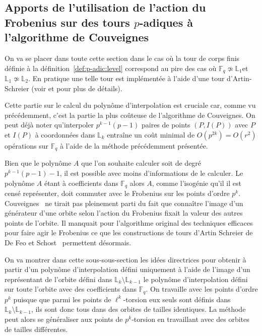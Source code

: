 \documentclass[10pt,a4paper]{book}
\theoremstyle{plain}
\theoremstyle{definition}
\theoremstyle{definition}
\theoremstyle{definition}
\theoremstyle{definition}
\theoremstyle{definition}
\theoremstyle{remark}
\theoremstyle{remark}
\theoremstyle{definition}
\begin{document}
\subsection{Apports de l'utilisation de l'action du Frobenius sur des tours $p$-adiques à l'algorithme de Couveignes}
\label{sub:fro:int}
On va se placer dans toute cette section dans le cas où la tour de corps
finis définie à la définition~\ref{def:p-adic:level} correspond au pire des cas où
$\mathbb{F}_q \not \simeq \mathbb{L}_1$et $\mathbb{L}_1 \not \simeq 
\mathbb{L}_2$. En pratique une telle tour est implémentée à l'aide d'une tour 
d'Artin-Schreier (voir \cite{DeFeo11} et \cite{DeFeo-Shost'12} pour plus de 
détails).

Cette partie sur le calcul du polynôme d'interpolation est cruciale car, comme vu précédemment, c'est la partie la plus coûteuse de l'algorithme de Couveignes. On peut déjà noter qu'interpoler $p^{k-1}(p-1)$ paires de points $(P,I(P))$ avec $P$ et $I(P)$ à coordonnées dans $\mathbb{L}_k$ entraîne un coût minimal de $O(p^{2k})=O(r^2)$ opérations sur $\mathbb{F}_q$ à l'aide de la méthode précédemment présentée. 

Bien que le polynôme $A$ que l'on souhaite calculer soit de degré $p^{k-1}
(p-1)-1$, il est possible avec moins d'informations de le calculer. Le polynôme
$A$ étant à coefficients dans $\mathbb{F}_q$ alors $A$, comme l'isogénie qu'il
il est censé représenter, doit commuter avec le Frobenius sur les points 
d'ordre $p^k$. Couveignes~\cite{Couveignes96} ne tirait pas 
pleinement parti du fait que connaître l'image d'un générateur d'une orbite 
selon l'action du Frobenius fixait la valeur des autres points de l'orbite. 
Il manquait pour l'algorithme original des techniques efficaces pour faire agir
le Frobenius ce que les constructions de tours d'Artin Schreier de De Feo et 
Schost~\cite{DeFeo-Shost'12} permettent désormais.

On va montrer dans cette sous-sous-section les idées directrices pour obtenir à partir 
d'un polynôme d'interpolation défini uniquement à l'aide de l'image d'un 
représentant de l'orbite défini dans $\mathbb{L}_k \setminus \mathbb{L}_{k-1}$ 
le polynôme d'interpolation défini sur toute l'orbite avec des coefficients 
dans $\mathbb{F}_q$. On travaille avec les points d'ordre $p^k$ puisque que 
parmi les points de $\ell^k$-torsion eux seuls sont définis dans 
$\mathbb{L}_k \setminus \mathbb{L}_{k-1}$, ils sont donc tous dans des orbites 
de tailles identiques. La méthode peut alors se généraliser aux points de 
$p^k$-torsion en travaillant avec des orbites de tailles différentes.
\end{document}
